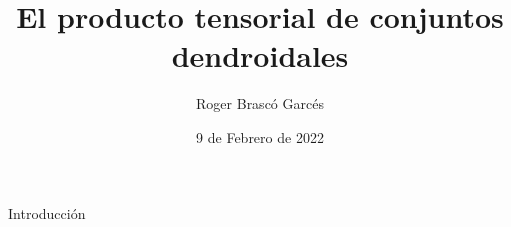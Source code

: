 \documentclass[12pt,aspectratio=169]{beamer}
\title[short title]{El producto tensorial de conjuntos dendroidales} %
\author[Roger Brasco] {Roger Brasc\'o Garc\'es}
\institute[NTU] %
{
    Departamento de Matem\'aticas e Inform\'atica \\
    Universidad de Barcelona %
}
\date{9 de Febrero de 2022} %
\numberwithin{equation}{section}
\theoremstyle{definition}
\begin{document}
\begin{frame}
    \titlepage
\end{frame}

\begin{frame}{Introducci\'on}
    \tableofcontents
\end{frame}
\end{document}
